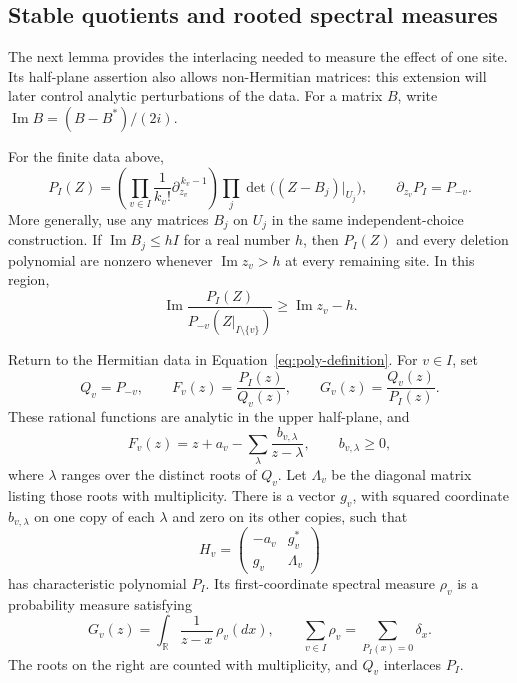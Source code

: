 \subsection{Stable quotients and rooted spectral measures}

The next lemma provides the interlacing needed to measure the effect of
one site.  Its half-plane assertion also allows non-Hermitian matrices:
this extension will later control analytic perturbations of the data.
For a matrix \(B\), write
\(\operatorname{Im}B=(B-B^*)/(2i)\).

\begin{lemma}\label{lem:polynomial-quotients}
For the finite data above,
\begin{equation}
 P_I(Z)=
 \left(\prod_{v\in I}\frac{1}{k_v!}
                  \partial_{z_v}^{\,k_v-1}\right)
            \prod_j\det\bigl((Z-B_j)|_{U_j}\bigr),
 \qquad \partial_{z_v}P_I=P_{-v}.
 \label{eq:poly-differential}
\end{equation}
More generally, use any matrices \(B_j\) on \(U_j\) in the same
independent-choice construction.  If
\(\operatorname{Im}B_j\leq hI\) for a real number \(h\), then \(P_I(Z)\)
and every deletion polynomial are nonzero whenever
\(\operatorname{Im}z_v>h\) at every remaining site.  In this region,
\begin{equation}
 \operatorname{Im}\frac{P_I(Z)}{P_{-v}(Z|_{I\setminus\{v\}})}
                         \geq\operatorname{Im}z_v-h.
 \label{eq:poly-half-plane}
\end{equation}

Return to the Hermitian data in Equation~\eqref{eq:poly-definition}.
For \(v\in I\), set
\[
 Q_v=P_{-v},\qquad F_v(z)=\frac{P_I(z)}{Q_v(z)},
 \qquad G_v(z)=\frac{Q_v(z)}{P_I(z)}.
\]
These rational functions are analytic in the upper half-plane, and
\begin{equation}
 F_v(z)=z+a_v-\sum_{\lambda}\frac{b_{v,\lambda}}{z-\lambda},
                      \qquad b_{v,\lambda}\geq0,
 \label{eq:poly-arrow-quotient}
\end{equation}
where \(\lambda\) ranges over the distinct roots of \(Q_v\).
Let \(\Lambda_v\) be the diagonal matrix listing those roots with
multiplicity.  There is a vector
\(g_v\), with squared coordinate \(b_{v,\lambda}\) on one copy of each
\(\lambda\) and zero on its other copies, such that
\begin{equation}
                H_v=\begin{pmatrix}-a_v&g_v^*\\ g_v&\Lambda_v\end{pmatrix}
 \label{eq:poly-arrow}
\end{equation}
has characteristic polynomial \(P_I\).  Its first-coordinate spectral
measure \(\rho_v\) is a probability measure satisfying
\begin{equation}
 G_v(z)=\int_{\mathbb R}\frac{1}{z-x}\,\rho_v(dx),\qquad
 \sum_{v\in I}\rho_v=\sum_{P_I(x)=0}\delta_x.
 \label{eq:poly-root-measures}
\end{equation}
The roots on the right are counted with multiplicity, and \(Q_v\)
interlaces \(P_I\).
\end{lemma}

